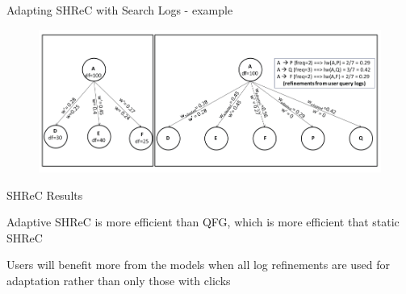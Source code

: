 \begin{frame}{Adapting SHReC with Search Logs - example}

\begin{figure}
	\includegraphics[scale=0.3]{img/A-SHReC-Example.png}
\end{figure}

\end{frame}


\begin{frame}{SHReC Results}

Adaptive SHReC is more efficient than QFG, which is more efficient that static SHReC \newline

Users will benefit more from the models when all log refinements are used for adaptation rather than only those with clicks

\end{frame}

